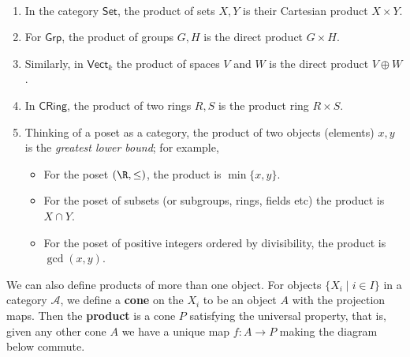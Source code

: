 \begin{example}
    \,
    \begin{enumerate}[label=(\alph*)]
    \item In the category $\mathsf{Set} $, the product of sets $X,Y$ is their Cartesian product $X\times Y$.
    \item For $\mathsf{Grp} $, the product of groups  $G,H$ is the direct product $G\times H$.
    \item Similarly, in $\mathsf{Vect} _k$ the product of spaces $V$ and $W$ is the direct product $V\oplus W$.
    \item In $\mathsf{CRing} $, the product of two rings $R,S$ is the product ring $R\times S$.
    \item Thinking of a poset as a category, the product of two objects (elements) $x,y$ is the \emph{greatest lower bound}; for example,
        \begin{itemize}
            \item For the poset $(\R,\leq)$, the product is $\operatorname{min}\{x,y\} $.
            \item For the poset of subsets (or subgroups, rings, fields etc) the product is $X\cap Y$.
            \item For the poset of positive integers ordered by divisibility, the product is $\gcd(x,y)$.
        \end{itemize}
\end{enumerate}
\end{example}
We can also define products of more than one object. For objects $\{X_i  \mid i\in I\} $ in a category $\mathcal{A} $, we define a \textbf{cone} on the $X_i $ to be an object $A$ with the projection maps. Then the \textbf{product} is a cone $P$ satisfying the universal property, that is, given any other cone $A$ we have a unique map $f\colon A \to P$ making the diagram below commute. 

